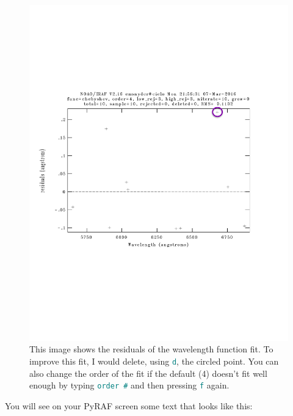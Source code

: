 \documentclass[12pt]{report}
\newcommand{\ty}[1]{\textcolor{teal}{\texttt{#1}}}
\begin{document}
\begin{figure}[h]
\centering
\includegraphics[scale=0.6]{wave_red_bad_new}
\caption[Example of the residuals of the wavelength fit]{This image shows the residuals of the wavelength function fit.  To improve this fit, I would delete, using \ty{d}, the circled point. You can also change the order of the fit if the default (4) doesn't fit well enough by typing \ty{order \#} and then pressing \ty{f} again.}
\label{fig:resids}
\end{figure}

You will see on your PyRAF screen some text that looks like this:
\end{document}
